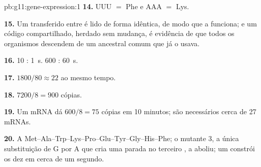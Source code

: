 \begin{solution}{pb:g11:gene-expression:1}
\textbf{14.} UUU $=$ Phe e AAA $=$ Lys.

\textbf{15.} Um  transferido entre  é lido de forma
idêntica, de modo que a  funciona; e um código
compartilhado, herdado sem mudança, é evidência de que todos os
organismos descendem de um ancestral comum que já o usava.

\textbf{16.} 10 : \qty{1}{s}. 600 : \qty{60}{s}.

\textbf{17.} $1800/80 \approx 22$  ao mesmo tempo.

\textbf{18.} $7200/8 = 900$ cópias.

\textbf{19.} Um mRNA dá $600/8 = 75$ cópias em 10 minutos; são
necessários cerca de 27 mRNAs.

\textbf{20.} A 
Met--Ala--Trp--Lys--Pro--Glu--Tyr--Gly--His--Phe; o mutante 3, a única
substituição de G por A que cria uma parada no terceiro , a
aboliu; um  constrói os dez  em cerca de um segundo.
\end{solution}
